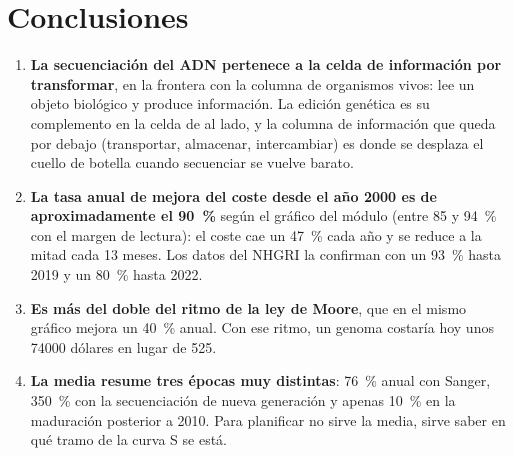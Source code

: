 \documentclass[11pt,letterpaper]{article}
\begin{document}
\section{Conclusiones}
\label{sec:conclusiones}

\begin{enumerate}[leftmargin=1.4em, itemsep=0.4em]
  \item \textbf{La secuenciación del ADN pertenece a la celda de información
    por transformar}, en la frontera con la columna de organismos vivos: lee
    un objeto biológico y produce información. La edición genética es su
    complemento en la celda de al lado, y la columna de información que queda
    por debajo (transportar, almacenar, intercambiar) es donde se desplaza el
    cuello de botella cuando secuenciar se vuelve barato.
  \item \textbf{La tasa anual de mejora del coste desde el año 2000 es de
    aproximadamente el 90~\%} según el gráfico del módulo (entre 85 y 94~\%
    con el margen de lectura): el coste cae un 47~\% cada año y se reduce a la
    mitad cada 13 meses. Los datos del NHGRI la confirman con un 93~\% hasta
    2019 y un 80~\% hasta 2022.
  \item \textbf{Es más del doble del ritmo de la ley de Moore}, que en el mismo
    gráfico mejora un 40~\% anual. Con ese ritmo, un genoma costaría hoy unos
    \num{74000} dólares en lugar de 525.
  \item \textbf{La media resume tres épocas muy distintas}: 76~\% anual con
    Sanger, 350~\% con la secuenciación de nueva generación y apenas 10~\% en
    la maduración posterior a 2010. Para planificar no sirve la media, sirve
    saber en qué tramo de la curva S se está.
\end{enumerate}

\printbibliography[title={Referencias}]
\end{document}
